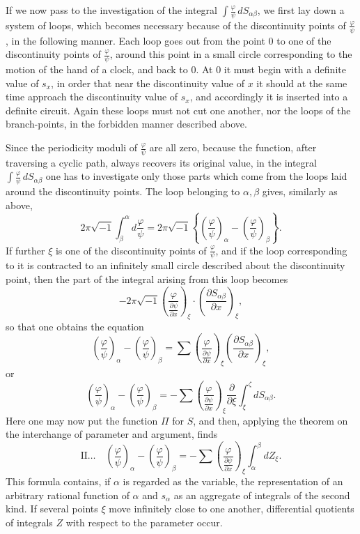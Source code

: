 \documentclass[10pt]{article}
\begin{document}
If we now pass to the investigation of the integral \(\int \frac{\varphi}{\psi}\,dS_{\alpha\beta}\), we first lay down a system of loops, which becomes necessary because of the discontinuity points of \(\frac{\varphi}{\psi}\), in the following manner. Each loop goes out from the point \(0\) to one of the discontinuity points of \(\frac{\varphi}{\psi}\), around this point in a small circle corresponding to the motion of the hand of a clock, and back to \(0\). At \(0\) it must begin with a definite value of \(s_x\), in order that near the discontinuity value of \(x\) it should at the same time approach the discontinuity value of \(s_x\), and accordingly it is inserted into a definite circuit. Again these loops must not cut one another, nor the loops of the branch-points, in the forbidden manner described above.

Since the periodicity moduli of \(\frac{\varphi}{\psi}\) are all zero, because the function, after traversing a cyclic path, always recovers its original value, in the integral \(\int \frac{\varphi}{\psi}\,dS_{\alpha\beta}\) one has to investigate only those parts which come from the loops laid around the discontinuity points. The loop belonging to \(\alpha,\beta\) gives, similarly as above,
\[
2\pi\sqrt{-1}\int_{\beta}^{\alpha} d\frac{\varphi}{\psi}
=2\pi\sqrt{-1}\left\{\left(\frac{\varphi}{\psi}\right)_{\alpha}-\left(\frac{\varphi}{\psi}\right)_{\beta}\right\}.
\]
If further \(\xi\) is one of the discontinuity points of \(\frac{\varphi}{\psi}\), and if the loop corresponding to it is contracted to an infinitely small circle described about the discontinuity point, then the part of the integral arising from this loop becomes
\[
-2\pi\sqrt{-1}\left(\frac{\varphi}{\frac{\partial\psi}{\partial x}}\right)_{\xi}\cdot
\left(\frac{\partial S_{\alpha\beta}}{\partial x}\right)_{\xi},
\]
so that one obtains the equation
\[
\left(\frac{\varphi}{\psi}\right)_{\alpha}-\left(\frac{\varphi}{\psi}\right)_{\beta}
=\sum\left(\frac{\varphi}{\frac{\partial\psi}{\partial x}}\right)_{\xi}
\left(\frac{\partial S_{\alpha\beta}}{\partial x}\right)_{\xi},
\]
or
\[
\left(\frac{\varphi}{\psi}\right)_{\alpha}-\left(\frac{\varphi}{\psi}\right)_{\beta}
=-\sum\left(\frac{\varphi}{\frac{\partial\psi}{\partial x}}\right)_{\xi}
\frac{\partial}{\partial\xi}\int_{\xi}^{\zeta}dS_{\alpha\beta}.
\]
Here one may now put the function \(\Pi\) for \(S\), and then, applying the theorem on the interchange of parameter and argument, finds
\[
\mathrm{II}\ldots\quad
\left(\frac{\varphi}{\psi}\right)_{\alpha}-\left(\frac{\varphi}{\psi}\right)_{\beta}
=-\sum\left(\frac{\varphi}{\frac{\partial\psi}{\partial x}}\right)_{\xi}
\int_{\alpha}^{\beta}dZ_{\xi}.
\]
This formula contains, if \(\alpha\) is regarded as the variable, the representation of an arbitrary rational function of \(\alpha\) and \(s_{\alpha}\) as an aggregate of integrals of the second kind. If several points \(\xi\) move infinitely close to one another, differential quotients of integrals \(Z\) with respect to the parameter occur.
\end{document}
